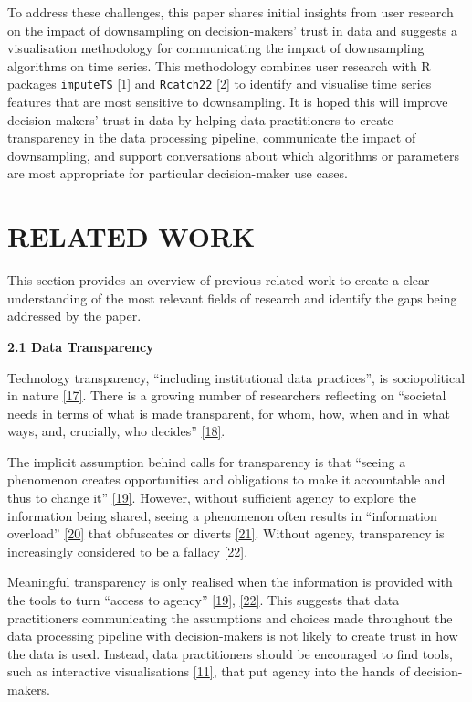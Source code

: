 \documentclass{article}
\begin{document}
To address these challenges, this paper shares initial insights from
user research on the impact of downsampling on decision-makers' trust in
data and suggests a visualisation methodology for communicating the
impact of downsampling algorithms on time series. This methodology
combines user research with R packages \texttt{imputeTS}
\protect\hyperlink{ref-imputeTS_R}{{[}1{]}} and \texttt{Rcatch22}
\protect\hyperlink{ref-catch22_R}{{[}2{]}} to identify and visualise
time series features that are most sensitive to downsampling. It is
hoped this will improve decision-makers' trust in data by helping data
practitioners to create transparency in the data processing pipeline,
communicate the impact of downsampling, and support conversations about
which algorithms or parameters are most appropriate for particular
decision-maker use cases.

\hypertarget{related-work}{%
\section{RELATED WORK}\label{related-work}}

This section provides an overview of previous related work to create a
clear understanding of the most relevant fields of research and identify
the gaps being addressed by the paper.

\textbf{2.1 Data Transparency}

Technology transparency, ``including institutional data practices'', is
sociopolitical in nature
\protect\hyperlink{ref-political_transparency}{{[}17{]}}. There is a
growing number of researchers reflecting on ``societal needs in terms of
what is made transparent, for whom, how, when and in what ways, and,
crucially, who decides''
\protect\hyperlink{ref-social_transparency}{{[}18{]}}.

The implicit assumption behind calls for transparency is that ``seeing a
phenomenon creates opportunities and obligations to make it accountable
and thus to change it''
\protect\hyperlink{ref-transparency_lack}{{[}19{]}}. However, without
sufficient agency to explore the information being shared, seeing a
phenomenon often results in ``information overload''
\protect\hyperlink{ref-digital_transparency}{{[}20{]}} that obfuscates
or diverts \protect\hyperlink{ref-transparency_obfuscation}{{[}21{]}}.
Without agency, transparency is increasingly considered to be a fallacy
\protect\hyperlink{ref-transparency_fallacy}{{[}22{]}}.

Meaningful transparency is only realised when the information is
provided with the tools to turn ``access to agency''
\protect\hyperlink{ref-transparency_lack}{{[}19{]}},
\protect\hyperlink{ref-transparency_fallacy}{{[}22{]}}. This suggests
that data practitioners communicating the assumptions and choices made
throughout the data processing pipeline with decision-makers is not
likely to create trust in how the data is used. Instead, data
practitioners should be encouraged to find tools, such as interactive
visualisations \protect\hyperlink{ref-datapoint}{{[}11{]}}, that put
agency into the hands of decision-makers.
\end{document}
